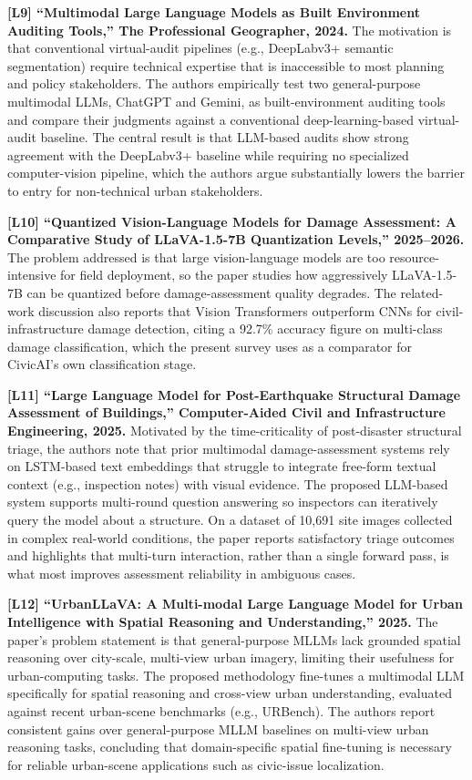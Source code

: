 \documentclass[conference]{IEEEtran}
\begin{document}
\textbf{[L9] ``Multimodal Large Language Models as Built Environment Auditing Tools,'' The Professional Geographer, 2024.} The motivation is that conventional virtual-audit pipelines (e.g., DeepLabv3+ semantic segmentation) require technical expertise that is inaccessible to most planning and policy stakeholders. The authors empirically test two general-purpose multimodal LLMs, ChatGPT and Gemini, as built-environment auditing tools and compare their judgments against a conventional deep-learning-based virtual-audit baseline. The central result is that LLM-based audits show strong agreement with the DeepLabv3+ baseline while requiring no specialized computer-vision pipeline, which the authors argue substantially lowers the barrier to entry for non-technical urban stakeholders.

\textbf{[L10] ``Quantized Vision-Language Models for Damage Assessment: A Comparative Study of LLaVA-1.5-7B Quantization Levels,'' 2025--2026.} The problem addressed is that large vision-language models are too resource-intensive for field deployment, so the paper studies how aggressively LLaVA-1.5-7B can be quantized before damage-assessment quality degrades. The related-work discussion also reports that Vision Transformers outperform CNNs for civil-infrastructure damage detection, citing a 92.7\% accuracy figure on multi-class damage classification, which the present survey uses as a comparator for CivicAI's own classification stage.

\textbf{[L11] ``Large Language Model for Post-Earthquake Structural Damage Assessment of Buildings,'' Computer-Aided Civil and Infrastructure Engineering, 2025.} Motivated by the time-criticality of post-disaster structural triage, the authors note that prior multimodal damage-assessment systems rely on LSTM-based text embeddings that struggle to integrate free-form textual context (e.g., inspection notes) with visual evidence. The proposed LLM-based system supports multi-round question answering so inspectors can iteratively query the model about a structure. On a dataset of 10,691 site images collected in complex real-world conditions, the paper reports satisfactory triage outcomes and highlights that multi-turn interaction, rather than a single forward pass, is what most improves assessment reliability in ambiguous cases.

\textbf{[L12] ``UrbanLLaVA: A Multi-modal Large Language Model for Urban Intelligence with Spatial Reasoning and Understanding,'' 2025.} The paper's problem statement is that general-purpose MLLMs lack grounded spatial reasoning over city-scale, multi-view urban imagery, limiting their usefulness for urban-computing tasks. The proposed methodology fine-tunes a multimodal LLM specifically for spatial reasoning and cross-view urban understanding, evaluated against recent urban-scene benchmarks (e.g., URBench). The authors report consistent gains over general-purpose MLLM baselines on multi-view urban reasoning tasks, concluding that domain-specific spatial fine-tuning is necessary for reliable urban-scene applications such as civic-issue localization.
\end{document}
